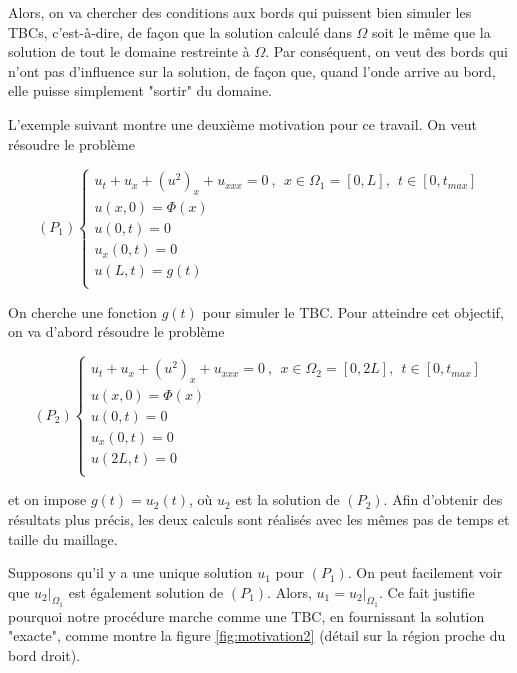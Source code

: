 \indent Alors, on va chercher des conditions aux bords qui puissent bien simuler les TBCs, c'est-à-dire, de façon que la solution calculé dans $\Omega$ soit le même que la solution de tout le domaine restreinte à $\Omega$. Par conséquent, on veut des bords qui n'ont pas d'influence sur la solution, de façon que, quand l'onde arrive au bord, elle puisse simplement "sortir" du domaine.

\indent L'exemple suivant montre une deuxième motivation pour ce travail. On veut résoudre le problème 

\begin{equation*}
    (P_1) \begin{cases}
    u_t + u_x + (u^2)_x + u_{xxx} = 0 \ , \ \ x \in \Omega_1 = [0,L], \ \ t \in [0, t_{max}] \\
    u(x,0) = \Phi(x) \\
    u(0,t) = 0 \\
    u_x(0,t) = 0 \\
    u(L,t) = g(t)  \\ 
    \end{cases}
\end{equation*}

\indent On cherche une fonction  $g(t)$ pour simuler le TBC. Pour atteindre cet objectif, on va d'abord résoudre le problème

\begin{equation*}
    (P_2) \begin{cases}
    u_t + u_x + (u^2)_x + u_{xxx} = 0 \ , \ \ x \in \Omega_2 = [0,2L], \ \ t \in [0, t_{max}] \\
    u(x,0) = \Phi(x) \\
    u(0,t) = 0 \\
    u_x(0,t) = 0 \\
    u(2L,t) = 0  \\ 
    \end{cases}
\end{equation*}

\noindent et on impose $g(t) = u_2(t)$, où $u_2$ est la solution de $(P_2)$. Afin d'obtenir des résultats plus précis, les deux calculs sont réalisés avec les mêmes pas de temps et taille du maillage.

\indent Supposons qu'il y a une unique solution $u_1$ pour $(P_1)$. On peut facilement voir que $u_2|_{\Omega_1}$ est également solution de $(P_1)$. Alors, $u_1 = u_2|_{\Omega_1}$. Ce fait justifie pourquoi notre procédure marche comme une TBC, en fournissant la solution "exacte", comme montre la figure \ref{fig:motivation2}  (détail sur la région proche du bord droit).

